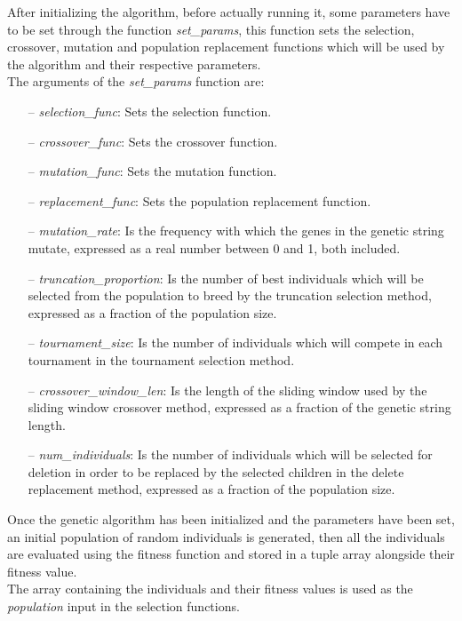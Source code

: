 After initializing the algorithm, before actually running it, some parameters have to be set through the function \textit{set\_params}, this function sets the selection, crossover, mutation and population replacement functions which will be used by the algorithm and their respective parameters.
\\The arguments of the \textit{set\_params} function are:
\begin{itemize}
\item[--]\textit{selection\_func}: Sets the selection function.
\item[--]\textit{crossover\_func}: Sets the crossover function.
\item[--]\textit{mutation\_func}: Sets the mutation function.
\item[--]\textit{replacement\_func}: Sets the population replacement function.
\item[--]\textit{mutation\_rate}: Is the frequency with which the genes in the genetic string mutate, expressed as a real number between 0 and 1, both included.
\item[--]\textit{truncation\_proportion}: Is the number of best individuals which will be selected from the population to breed by the truncation selection method, expressed as a fraction of the population size.
\item[--]\textit{tournament\_size}: Is the number of individuals which will compete in each tournament in the tournament selection method.
\item[--]\textit{crossover\_window\_len}: Is the length of the sliding window used by the sliding window crossover method, expressed as a fraction of the genetic string length.
\item[--]\textit{num\_individuals}: Is the number of individuals which will be selected for deletion in order to be replaced by the selected children in the delete replacement method, expressed as a fraction of the population size.
\end{itemize}

Once the genetic algorithm has been initialized and the parameters have been set, an initial population of random individuals is generated, then all the individuals are evaluated using the fitness function and stored in a tuple array alongside their fitness value.
\\The array containing the individuals and their fitness values is used as the \textit{population} input in the selection functions.

